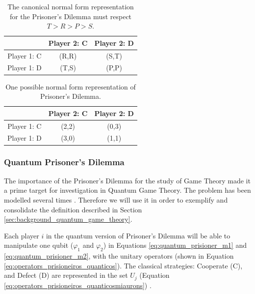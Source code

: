 \begin{center}
\begin{table}
\begin{centering}
\begin{tabular}{ccc}
\hline 
 & Player 2: C & Player 2: D\tabularnewline
\hline 
Player 1: C & (R,R) & (S,T)\tabularnewline
Player 1: D & (T,S) & (P,P)\tabularnewline
\hline 
\end{tabular}
\par\end{centering}

\caption{The canonical normal form representation for the Prisoner's Dilemma must respect $T>R>P>S$.}
\label{tab:prisionersdillema_tab1}
\end{table}
\par\end{center}

\begin{center}
\begin{table}
\begin{centering}
\begin{tabular}{ccc}
\hline 
 & Player 2: C & Player 2: D\tabularnewline
\hline 
Player 1: C & (2,2) & (0,3)\tabularnewline
Player 1: D & (3,0) & (1,1)\tabularnewline
\hline 
\end{tabular}
\par\end{centering}

\caption{One possible normal form representation of Prisoner's Dilemma.}
\label{tab:prisionersdillema_tab2}
\end{table}
\par\end{center}



\subsubsection{Quantum Prisoner's Dilemma}
\label{subsubsec:quantum_prisioners_dillema}

The importance of the Prisoner's Dilemma for the study of Game Theory made it a prime target for investigation in Quantum Game Theory. The problem has been modelled several times \cite{Eisert2008}\cite{Fra2011a}. Therefore we will use it in order to exemplify and consolidate the definition described in Section \ref{sec:background_quantum_game_theory}\cite{Fra2011a}. 

Each player $i$ in the quantum version of Prisoner's Dilemma will be able to manipulate one qubit ($\varphi_{1}$ and $\varphi_{2}$) in Equations \ref{eq:quantum_prisioner_m1} and \ref{eq:quantum_prisioner_m2}, with the unitary operators (shown in Equation \ref{eq:operators_prisioneiros_quanticos}). The  classical strategies: Cooperate (C), and Defect (D) are represented in the set $U_{j}$ (Equation \ref{eq:operators_prisioneiros_quanticosmiaurons}) . 

